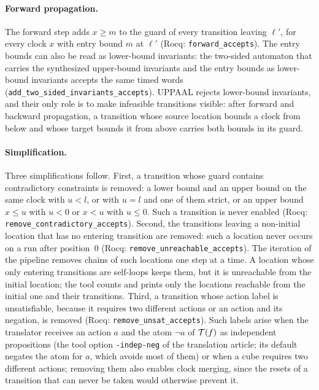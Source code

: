 \paragraph{Forward propagation.}
The forward step adds $x\ge m$ to the guard of every transition leaving
$\ell'$, for every clock $x$ with entry bound $m$ at $\ell'$ (Rocq:
\texttt{forward\_\allowbreak{}accepts}).  The entry bounds can also be read as lower-bound
invariants: the two-sided automaton that carries the synthesized upper-bound
invariants and the entry bounds as lower-bound invariants accepts the same
timed words (\texttt{add\_\allowbreak{}two\_\allowbreak{}sided\_\allowbreak{}invariants\_\allowbreak{}accepts}).  UPPAAL
rejects lower-bound invariants, and their only role is to make infeasible
transitions visible: after forward and backward propagation, a transition whose
source location bounds a clock from below and whose target bounds it from above
carries both bounds in its guard.

\paragraph{Simplification.}
Three simplifications follow.  First, a transition whose guard contains
contradictory constraints is removed: a lower bound and an upper bound on the
same clock with $u<l$, or with $u=l$ and one of them strict, or an upper bound
$x\le u$ with $u<0$ or $x<u$ with $u\le0$.  Such a transition is never enabled (Rocq:
\texttt{remove\_\allowbreak{}contradictory\_\allowbreak{}accepts}).  Second, the transitions
leaving a non-initial location that has no entering transition
are removed: such a location never occurs on a run after position~$0$ (Rocq:
\texttt{remove\_\allowbreak{}unreachable\_\allowbreak{}accepts}).  The iteration of the pipeline
removes chains of such locations one step at a time.  A location whose only
entering transitions are self-loops keeps them, but it is unreachable from
the initial location; the tool counts and prints only the locations
reachable from the initial one and their transitions.  Third, a transition whose
action label is unsatisfiable, because it requires two different actions or an
action and its negation, is removed (Rocq:
\texttt{remove\_\allowbreak{}unsat\_\allowbreak{}accepts}).  Such labels arise when the
translator receives an action $a$ and the atom $\neg a$ of $\mathcal{T}(f)$ as independent
propositions (the tool option \texttt{-indep-neg} of the translation article;
its default negates the atom for $a$, which avoids most of them) or when a cube
requires two different actions; removing them also enables clock merging, since the resets of a
transition that can never be taken would otherwise prevent it.

